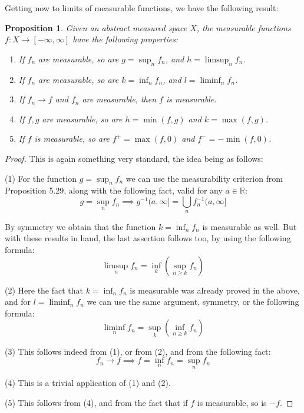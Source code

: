 \documentclass[12pt]{amsbook}
\newtheorem{proposition}[theorem]{Proposition}
\begin{document}
Getting now to limits of measurable functions, we have the following result:

\begin{proposition}
Given an abstract measured space $X$, the measurable functions $f:X\to[-\infty,\infty]$ have the following properties:
\begin{enumerate}
\item If $f_n$ are measurable, so are $g=\sup_nf_n$, and $h=\limsup_nf_n$.

\item If $f_n$ are measurable, so are $k=\inf_nf_n$, and $l=\liminf_nf_n$.

\item If $f_n\to f$ and $f_n$ are measurable, then $f$ is measurable.

\item If $f,g$ are measurable, so are $h=\min(f,g)$ and $k=\max(f,g)$.

\item If $f$ is measurable, so are $f^+=\max(f,0)$ and $f^-=-\min(f,0)$.
\end{enumerate}
\end{proposition}

\begin{proof}
This is again something very standard, the idea being as follows:

\medskip

(1) For the function $g=\sup_nf_n$ we can use the measurability criterion from Proposition 5.29, along with the following fact, valid for any $a\in\mathbb R$:
$$g=\sup_nf_n\implies g^{-1}(a,\infty]=\bigcup_nf_n^{-1}(a,\infty]$$

By symmetry we obtain that the function $k=\inf_nf_n$ is measurable as well. But with these results in hand, the last assertion follows too, by using the following formula:
$$\limsup_nf_n=\inf_k\left(\sup_{n\geq k}f_n\right)$$

(2) Here the fact that $k=\inf_nf_n$ is measurable was already proved in the above, and for $l=\liminf_nf_n$ we can use the same argument, symmetry, or the following formula:
$$\liminf_nf_n=\sup_k\left(\inf_{n\geq k}f_n\right)$$

(3) This follows indeed from (1), or from (2), and from the following fact:
$$f_n\to f\implies f=\inf_nf_n=\sup_nf_n$$

(4) This is a trivial application of (1) and (2).

\medskip

(5) This follows from (4), and from the fact that if $f$ is measurable, so is $-f$.
\end{proof}
\end{document}
